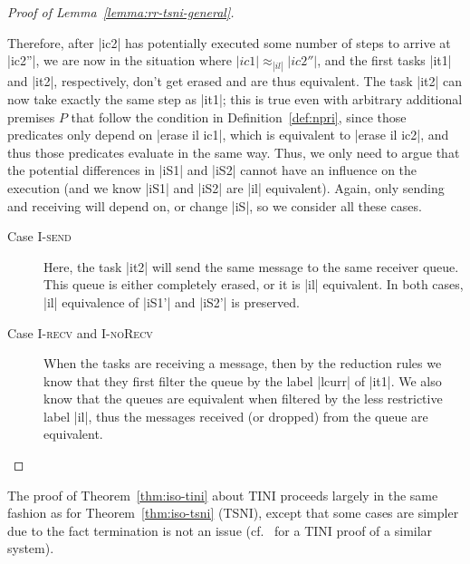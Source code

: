 \begin{proof}[Proof of Lemma~\ref{lemma:rr-tsni-general}]
\begin{itemize}
    
    Therefore, after |ic2| has potentially executed some number of steps
    to arrive at |ic2''|, we are now in the situation where $|ic1|\approx_{|il|}|ic2''|$, and the first tasks |it1| and |it2|,
    respectively, don't get erased and are thus equivalent.
    The task |it2| can now take exactly the same step as |it1|;  this
    is true even with arbitrary additional premises $P$ that follow
    the condition in Definition~\ref{def:npri}, since those
    predicates only depend on |erase il ic1|, which is equivalent
    to |erase il ic2|, and thus those predicates evaluate in the same way.
    Thus, we only
    need to argue that the potential differences in |iS1| and |iS2| cannot
    have an influence on the execution (and we know |iS1| and |iS2| are
    |il| equivalent).
    Again, only sending and receiving will depend on, or change |iS|,
    so we consider all these cases.
    \begin{description}
      \item[Case \textsc{I-send}]
      Here, the task |it2| will send the same message to the same
      receiver queue. This
      queue is either completely erased, or it is |il| equivalent.  In both
      cases, |il| equivalence of |iS1'| and |iS2'| is preserved.
      \item[Case \textsc{I-recv} and \textsc{I-noRecv}]
      When the tasks are receiving a message, then by the reduction rules
      we know that they first filter the queue by the label
      |lcurr| of |it1|.  We
      also know that the queues are equivalent when filtered by the less
      restrictive label |il|, thus the messages received (or dropped) from the
      queue are equivalent.
    \end{description}
  \end{itemize}
\end{proof}


The proof of Theorem~\ref{thm:iso-tini} about TINI proceeds largely
in the same fashion as for Theorem~\ref{thm:iso-tsni} (TSNI), except that
some cases are simpler due to the fact termination is not an issue
(cf.~\tocite{} for a TINI proof of a similar system).

